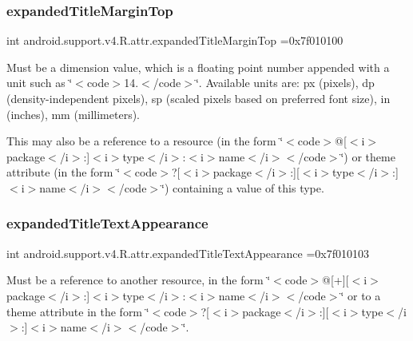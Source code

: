 \subsubsection{\texorpdfstring{expanded\+Title\+Margin\+Top}{expandedTitleMarginTop}}
{\footnotesize\ttfamily int android.\+support.\+v4.\+R.\+attr.\+expanded\+Title\+Margin\+Top =0x7f010100\hspace{0.3cm}{\ttfamily [static]}}

Must be a dimension value, which is a floating point number appended with a unit such as \char`\"{}$<$code$>$14.\+5sp$<$/code$>$\char`\"{}. Available units are\+: px (pixels), dp (density-\/independent pixels), sp (scaled pixels based on preferred font size), in (inches), mm (millimeters). 

This may also be a reference to a resource (in the form \char`\"{}$<$code$>$@\mbox{[}$<$i$>$package$<$/i$>$\+:\mbox{]}$<$i$>$type$<$/i$>$\+:$<$i$>$name$<$/i$>$$<$/code$>$\char`\"{}) or theme attribute (in the form \char`\"{}$<$code$>$?\mbox{[}$<$i$>$package$<$/i$>$\+:\mbox{]}\mbox{[}$<$i$>$type$<$/i$>$\+:\mbox{]}$<$i$>$name$<$/i$>$$<$/code$>$\char`\"{}) containing a value of this type. \mbox{\label{classandroid_1_1support_1_1v4_1_1R_1_1attr_a69dbcfdcd006db32b95a1424ebe2dd94}} 
\subsubsection{\texorpdfstring{expanded\+Title\+Text\+Appearance}{expandedTitleTextAppearance}}
{\footnotesize\ttfamily int android.\+support.\+v4.\+R.\+attr.\+expanded\+Title\+Text\+Appearance =0x7f010103\hspace{0.3cm}{\ttfamily [static]}}

Must be a reference to another resource, in the form \char`\"{}$<$code$>$@\mbox{[}+\mbox{]}\mbox{[}$<$i$>$package$<$/i$>$\+:\mbox{]}$<$i$>$type$<$/i$>$\+:$<$i$>$name$<$/i$>$$<$/code$>$\char`\"{} or to a theme attribute in the form \char`\"{}$<$code$>$?\mbox{[}$<$i$>$package$<$/i$>$\+:\mbox{]}\mbox{[}$<$i$>$type$<$/i$>$\+:\mbox{]}$<$i$>$name$<$/i$>$$<$/code$>$\char`\"{}. \mbox{\label{classandroid_1_1support_1_1v4_1_1R_1_1attr_a9093b99d885b00ebfb4ceb7d8f2ca206}} 
